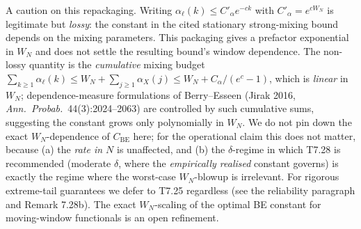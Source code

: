 \documentclass[
]{article}
\begin{document}
A caution on this repackaging. Writing $\alpha_\ell(k) \leq C'_\alpha
e^{-ck}$ with $C'_\alpha = e^{c W_N}$ is legitimate but \emph{lossy}:
the constant in the cited stationary strong-mixing bound depends on
the mixing parameters. This packaging gives a prefactor exponential
in $W_N$ and does not settle the resulting bound's window dependence. The non-lossy quantity is the
\emph{cumulative} mixing budget $\sum_{k \geq 1} \alpha_\ell(k) \leq
W_N + \sum_{j \geq 1}\alpha_X(j) \leq W_N + C_\alpha/(e^c - 1)$, which
is \emph{linear} in $W_N$; dependence-measure formulations of
Berry--Esseen (Jirak 2016, \emph{Ann.\ Probab.}\ 44(3):2024--2063) are
controlled by such cumulative sums, suggesting the constant grows only
polynomially in $W_N$. We do not pin down the exact $W_N$-dependence
of $C_{\mathrm{BE}}$ here; for the operational claim this does not
matter, because (a) the \emph{rate in $N$} is unaffected, and (b) the
$\delta$-regime in which T7.28 is recommended (moderate $\delta$, where
the \emph{empirically realised} constant governs) is exactly the regime
where the worst-case $W_N$-blowup is irrelevant. For rigorous
extreme-tail guarantees we defer to T7.25 regardless (see the
reliability paragraph and Remark 7.28b). The exact $W_N$-scaling of the
optimal BE constant for moving-window functionals is an open
refinement.
\end{document}
